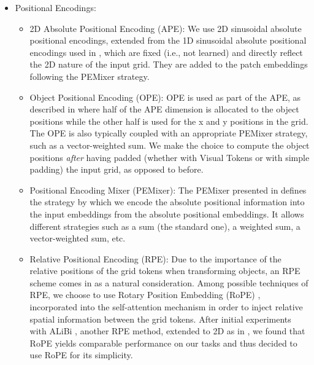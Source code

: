 \begin{itemize}
    \item Positional Encodings:
        \begin{itemize}
            \item 2D Absolute Positional Encoding (APE): We use 2D sinusoidal absolute positional encodings, extended from the 1D sinusoidal absolute positional encodings used in \citep{vaswani2017attention}, which are fixed (i.e., not learned) and directly reflect the 2D nature of the input grid. They are added to the patch embeddings following the PEMixer strategy.

            \vspace{1em}
            \item Object Positional Encoding (OPE): OPE is used as part of the APE, as described in \citep{arc_vit} where half of the APE dimension is allocated to the object positions while the other half is used for the x and y positions in the grid. The OPE is also typically coupled with an appropriate PEMixer strategy, such as a vector-weighted sum. We make the choice to compute the object positions \textit{after} having padded (whether with Visual Tokens or with simple padding) the input grid, as opposed to before.

            \vspace{1em}
            \item Positional Encoding Mixer (PEMixer): The PEMixer presented in \citep{arc_vit} defines the strategy by which we encode the absolute positional information into the input embeddings from the absolute positional embeddings. It allows different strategies such as a sum (the standard one), a weighted sum, a vector-weighted sum, etc.

            \vspace{1em}
            \item Relative Positional Encoding (RPE): Due to the importance of the relative positions of the grid tokens when transforming objects, an RPE scheme comes in as a natural consideration. Among possible techniques of RPE, we choose to use Rotary Position Embedding (RoPE) \citep{Su_RoFormer_2024}, incorporated into the self-attention mechanism in order to inject relative spatial information between the grid tokens. After initial experiments with ALiBi \citep{press2022trainshorttestlong}, another RPE method, extended to 2D as in \citep{arc_vit}, we found that RoPE yields comparable performance on our tasks and thus decided to use RoPE for its simplicity.
            

\end{itemize}
\end{itemize}

